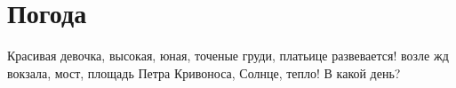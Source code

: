  
 
 
 
 

\chapter{Погода}
\label{sec:kiev.pogoda}


Красивая девочка, высокая, юная, точеные груди, платьице развевается!  возле жд
вокзала, мост, площадь Петра Кривоноса, Солнце, тепло! В какой день? 


